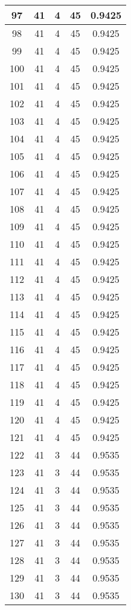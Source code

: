 \documentclass[letterpaper, 12pt]{article}
\begin{document}
\begin{longtable}{|c|c|c|c|c|}
\hline
97 & 41 & 4 & 45 & 0.9425 \\
\hline
98 & 41 & 4 & 45 & 0.9425 \\
\hline
99 & 41 & 4 & 45 & 0.9425 \\
\hline
100 & 41 & 4 & 45 & 0.9425 \\
\hline
101 & 41 & 4 & 45 & 0.9425 \\
\hline
102 & 41 & 4 & 45 & 0.9425 \\
\hline
103 & 41 & 4 & 45 & 0.9425 \\
\hline
104 & 41 & 4 & 45 & 0.9425 \\
\hline
105 & 41 & 4 & 45 & 0.9425 \\
\hline
106 & 41 & 4 & 45 & 0.9425 \\
\hline
107 & 41 & 4 & 45 & 0.9425 \\
\hline
108 & 41 & 4 & 45 & 0.9425 \\
\hline
109 & 41 & 4 & 45 & 0.9425 \\
\hline
110 & 41 & 4 & 45 & 0.9425 \\
\hline
111 & 41 & 4 & 45 & 0.9425 \\
\hline
112 & 41 & 4 & 45 & 0.9425 \\
\hline
113 & 41 & 4 & 45 & 0.9425 \\
\hline
114 & 41 & 4 & 45 & 0.9425 \\
\hline
115 & 41 & 4 & 45 & 0.9425 \\
\hline
116 & 41 & 4 & 45 & 0.9425 \\
\hline
117 & 41 & 4 & 45 & 0.9425 \\
\hline
118 & 41 & 4 & 45 & 0.9425 \\
\hline
119 & 41 & 4 & 45 & 0.9425 \\
\hline
120 & 41 & 4 & 45 & 0.9425 \\
\hline
121 & 41 & 4 & 45 & 0.9425 \\
\hline
122 & 41 & 3 & 44 & 0.9535 \\
\hline
123 & 41 & 3 & 44 & 0.9535 \\
\hline
124 & 41 & 3 & 44 & 0.9535 \\
\hline
125 & 41 & 3 & 44 & 0.9535 \\
\hline
126 & 41 & 3 & 44 & 0.9535 \\
\hline
127 & 41 & 3 & 44 & 0.9535 \\
\hline
128 & 41 & 3 & 44 & 0.9535 \\
\hline
129 & 41 & 3 & 44 & 0.9535 \\
\hline
130 & 41 & 3 & 44 & 0.9535 \\

\end{longtable}
\end{document}
